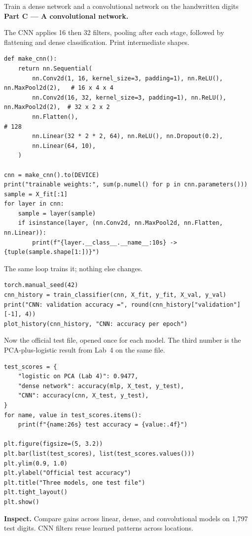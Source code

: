 \begin{labproject}{Train a dense network and a convolutional network on the handwritten digits}
\medskip\noindent\textbf{Part C --- A convolutional network.}\par

The CNN applies 16 then 32 filters, pooling after each stage, followed by flattening and dense classification. Print intermediate shapes.

\begin{lstlisting}[style=utppython]
def make_cnn():
    return nn.Sequential(
        nn.Conv2d(1, 16, kernel_size=3, padding=1), nn.ReLU(), nn.MaxPool2d(2),   # 16 x 4 x 4
        nn.Conv2d(16, 32, kernel_size=3, padding=1), nn.ReLU(), nn.MaxPool2d(2),  # 32 x 2 x 2
        nn.Flatten(),                                                             # 128
        nn.Linear(32 * 2 * 2, 64), nn.ReLU(), nn.Dropout(0.2),
        nn.Linear(64, 10),
    )

cnn = make_cnn().to(DEVICE)
print("trainable weights:", sum(p.numel() for p in cnn.parameters()))
sample = X_fit[:1]
for layer in cnn:
    sample = layer(sample)
    if isinstance(layer, (nn.Conv2d, nn.MaxPool2d, nn.Flatten, nn.Linear)):
        print(f"{layer.__class__.__name__:10s} -> {tuple(sample.shape[1:])}")
\end{lstlisting}

The same loop trains it; nothing else changes.

\begin{lstlisting}[style=utppython]
torch.manual_seed(42)
cnn_history = train_classifier(cnn, X_fit, y_fit, X_val, y_val)
print("CNN: validation accuracy =", round(cnn_history["validation"][-1], 4))
plot_history(cnn_history, "CNN: accuracy per epoch")
\end{lstlisting}

Now the official test file, opened once for each model. The third number is the PCA-plus-logistic result from Lab~4 on the same file.

\begin{lstlisting}[style=utppython]
test_scores = {
    "logistic on PCA (Lab 4)": 0.9477,
    "dense network": accuracy(mlp, X_test, y_test),
    "CNN": accuracy(cnn, X_test, y_test),
}
for name, value in test_scores.items():
    print(f"{name:26s} test accuracy = {value:.4f}")

plt.figure(figsize=(5, 3.2))
plt.bar(list(test_scores), list(test_scores.values()))
plt.ylim(0.9, 1.0)
plt.ylabel("Official test accuracy")
plt.title("Three models, one test file")
plt.tight_layout()
plt.show()
\end{lstlisting}

\textbf{Inspect.} Compare gains across linear, dense, and convolutional models on 1,797 test digits. CNN filters reuse learned patterns across locations.


\end{labproject}
